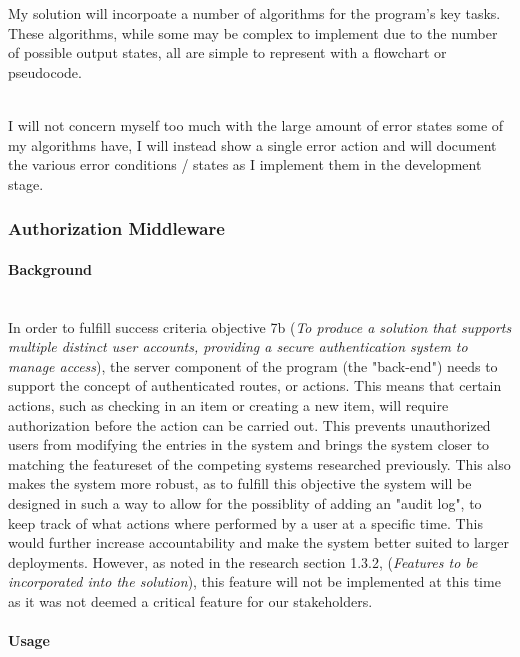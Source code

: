 \documentclass[../../main.tex]{subfiles}
\begin{document}
\noindent My solution will incorpoate a number of algorithms for the program's key tasks.
These algorithms, while some may be complex to implement due to the number of possible
output states, all are simple to represent with a flowchart or pseudocode.

\noindent \\ I will not concern myself too much with the large amount of error states some
of my algorithms have, I will instead show a single error action and will document the
various error conditions / states as I implement them in the development stage.

\subsubsection{Authorization Middleware}

\paragraph{Background}

\noindent \\ In order to fulfill success criteria objective 7b (\textit{To produce a solution that supports multiple
    distinct user accounts, providing a secure authentication system to manage access}), the server component of
the program (the "back-end") needs to support the concept of authenticated routes, or actions.
This means that certain actions, such as checking in an item or creating a new item, will require authorization
before the action can be carried out. This prevents unauthorized users from modifying the entries in the system
and brings the system closer to matching the featureset of the competing systems researched previously. This
also makes the system more robust, as to fulfill this objective the system will be designed in such a way
to allow for the possiblity of adding an "audit log", to keep track of what actions where performed by
a user at a specific time. This would further increase accountability and make the system better suited to larger
deployments. However, as noted in the research section 1.3.2, (\textit{Features to be incorporated into the solution}),
this feature will not be implemented at this time as it was not deemed a critical feature for our stakeholders.

\paragraph{Usage}
\end{document}
